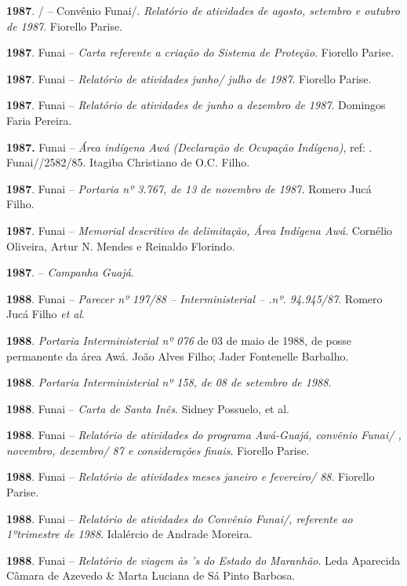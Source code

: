 \begin{Parskip}
\textbf{1987}. /  -- Convênio Funai/. \emph{Relatório de
atividades de agosto, setembro e outubro de 1987}. Fiorello Parise.

\textbf{1987}. Funai -- \emph{Carta referente a criação do Sistema de
Proteção}. Fiorello Parise.

\textbf{1987}. Funai -- \emph{Relatório de atividades junho/ julho de
1987}. Fiorello Parise.

\textbf{1987}. Funai -- \emph{Relatório de atividades de junho a dezembro
de 1987}. Domingos Faria Pereira.

\textbf{1987.} Funai -- \emph{Área indígena Awá (Declaração de Ocupação
Indígena)}, ref: . Funai//2582/85. Itagiba Christiano de O.C.
Filho.

\textbf{1987}. Funai -- \emph{Portaria nº 3.767, de 13 de novembro de
1987.} Romero Jucá Filho.

\textbf{1987}. Funai -- \emph{Memorial descritivo de delimitação, Área
Indígena Awá}. Cornélio Oliveira, Artur N. Mendes e Reinaldo Florindo.

\textbf{1987}.  -- \emph{Campanha Guajá}.

\textbf{1988}. Funai -- \emph{Parecer nº 197/88 --  Interministerial
-- .nº. 94.945/87}. Romero Jucá Filho \emph{et al}.

\textbf{1988}. \emph{Portaria Interministerial nº 076} de 03 de maio de
1988, de posse permanente da área Awá. João Alves Filho; Jader
Fontenelle Barbalho.

\textbf{1988}. \emph{Portaria Interministerial nº 158, de 08 de setembro
de 1988}.

\textbf{1988}. Funai -- \emph{Carta de Santa Inês}. Sidney Possuelo, et
al.

\textbf{1988}. Funai -- \emph{Relatório de atividades do programa
Awá-Guajá, convênio Funai/ , novembro, dezembro/ 87 e considerações
finais}. Fiorello Parise.

\textbf{1988}. Funai -- \emph{Relatório de atividades meses janeiro e
fevereiro/ 88}. Fiorello Parise.

\textbf{1988}. Funai -- \emph{Relatório de atividades do Convênio
Funai/, referente ao 1ºtrimestre de 1988}. Idalércio de Andrade
Moreira.

\textbf{1988}. Funai -- \emph{Relatório de viagem às 's do Estado do
Maranhão}. Leda Aparecida Câmara de Azevedo \& Marta Luciana de Sá Pinto
Barbosa.


\end{Parskip}
